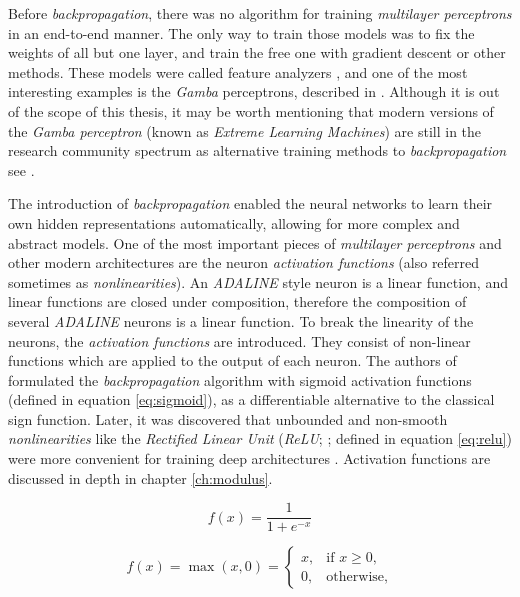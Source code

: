 Before \textit{backpropagation}, there was no algorithm for training \textit{multilayer perceptrons} in an end-to-end manner. The only way to train those models was to fix the weights of all but one layer, and train the free one with gradient descent or other methods. These models were called feature analyzers \autocite{hinton1986}, and one of the most interesting examples is the \textit{Gamba} perceptrons, described in \citet{minsky69}. Although it is out of the scope of this thesis, it may be worth mentioning that modern versions of the \textit{Gamba perceptron} (known as \textit{Extreme Learning Machines}) are still in the research community spectrum as alternative training methods to \textit{backpropagation} see \autocite{Huang2006, Huang2012}.

The introduction of \textit{backpropagation} enabled the neural networks to learn their own hidden representations automatically, allowing for more complex and abstract models. One of the most important pieces of \textit{multilayer perceptrons} and other modern architectures are the neuron \textit{activation functions} (also referred sometimes as \textit{nonlinearities}). An \textit{ADALINE} style neuron is a linear function, and linear functions are closed under composition, therefore the composition of several \textit{ADALINE} neurons is a linear function. To break the linearity of the neurons, the \textit{activation functions} are introduced. They consist of non-linear functions which are applied to the output of each neuron. The authors of \autocite{hinton1986} formulated the \textit{backpropagation} algorithm with sigmoid activation functions (defined in equation \ref{eq:sigmoid}), as a differentiable alternative to the classical sign function. Later, it was discovered that unbounded and non-smooth \textit{nonlinearities} like the \textit{Rectified Linear Unit} (\textit{ReLU}; \citealp{nair2010}; defined in equation \ref{eq:relu}) were more convenient for training deep architectures \autocite{Goodfellow2016}. Activation functions are discussed in depth in chapter \ref{ch:modulus}.


\begin{equation}
\label{eq:sigmoid}
f(x) = \frac{1}{1+e^{-x}}
\end{equation}

\begin{equation}
\label{eq:relu}
f(x) = \max(x, 0) =
\begin{cases}
x,          & \text{if } x \geq 0 ,\\
0,         & \text{otherwise},
\end{cases}
\end{equation}

